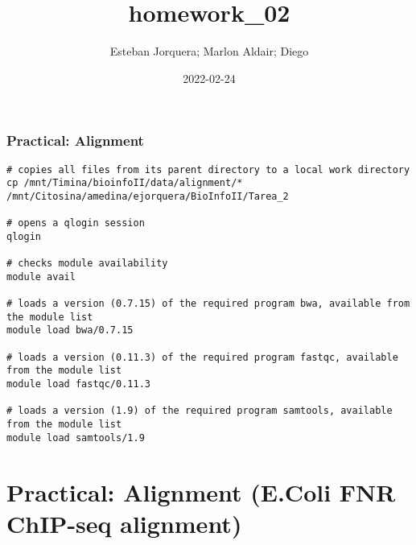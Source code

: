 \documentclass[
]{article}
\title{homework\_02}
\author{Esteban Jorquera; Marlon Aldair; Diego}
\date{2022-02-24}
\begin{document}
\maketitle

\hypertarget{practical-alignment}{%
\subsubsection{Practical: Alignment}\label{practical-alignment}}

\begin{verbatim}
# copies all files from its parent directory to a local work directory
cp /mnt/Timina/bioinfoII/data/alignment/* /mnt/Citosina/amedina/ejorquera/BioInfoII/Tarea_2

# opens a qlogin session
qlogin

# checks module availability 
module avail

# loads a version (0.7.15) of the required program bwa, available from the module list
module load bwa/0.7.15

# loads a version (0.11.3) of the required program fastqc, available from the module list
module load fastqc/0.11.3

# loads a version (1.9) of the required program samtools, available from the module list
module load samtools/1.9
\end{verbatim}

\hypertarget{practical-alignment-e.coli-fnr-chip-seq-alignment}{%
\section{Practical: Alignment (E.Coli FNR ChIP-seq
alignment)}\label{practical-alignment-e.coli-fnr-chip-seq-alignment}}
\end{document}
